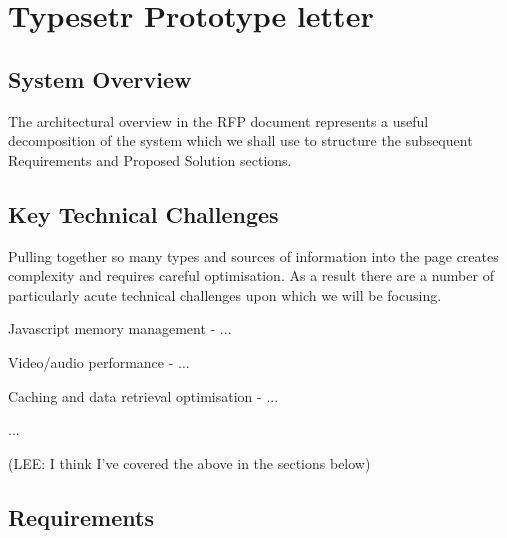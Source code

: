 \documentclass[a4paper, 11pt]{scrreprt}
\begin{document}
\newcommand{\tystrsubtitle}{}
\newcommand{\tystrtitle}{Untitled Document}
\newcommand{\tystrauthor}{LShift}
\newcommand{\tystrclient}{LShift}
\newcommand{\tystrproject}{internal}
\newcommand{\tystraffiliation}{LShift blah blah}
\newcommand{\tystrversion}{0.0}
\newcommand{\tystrdate}{2012-07-12}


\section{ Typesetr Prototype letter}
\label{h.v0in2tf244c4}

\subsection{System Overview}
\label{h.aqxdte3o5oy}
The architectural overview in the RFP document represents a useful decomposition of the system which we shall use to structure the subsequent Requirements and Proposed Solution sections.

\subsection{Key Technical Challenges}
\label{h.pz4ldwvctu7q}
Pulling together so many types and sources of information into the page creates complexity and requires careful optimisation. As a result there are a number of particularly acute technical challenges upon which we will be focusing.



\begin{tystrul}


\item Javascript memory management - ...

\item Video/audio performance - ...

\item Caching and data retrieval optimisation - ...

\item ...

\end{tystrul}

(LEE: I think I’ve covered the above in the sections below)


\subsection{Requirements}
\label{h.wzni16acjdug}
\end{document}
